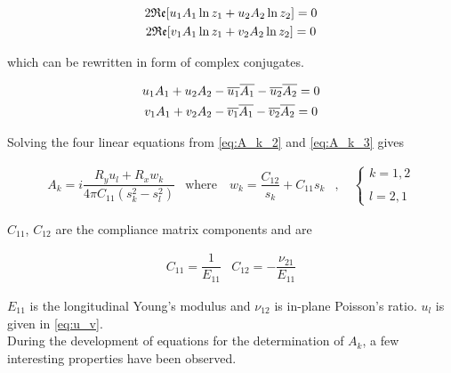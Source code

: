 \documentclass{article}
\begin{document}
\begin{gather*}
    2 \mathfrak{Re}[u_1 A_1 \ln z_1 + u_2 A_2 \ln z_2] = 0 \notag \\
    2 \mathfrak{Re}[v_1 A_1 \ln z_1 + v_2 A_2 \ln z_2] = 0
\end{gather*}

which can be rewritten in form of complex conjugates.

\begin{gather}
    u_1 A_1 + u_2 A_2 - \overline{u_1} \overline{A_1} - \overline{u_2} \overline{A_2} = 0 \notag \\
    v_1 A_1 + v_2 A_2 - \overline{v_1} \overline{A_1} - \overline{v_2} \overline{A_2} = 0
    \label{eq:A_k_3}
\end{gather}

Solving the four linear equations from \cref{eq:A_k_2} and \cref{eq:A_k_3} gives \cite{Koussios2009}

\begin{equation}
    \begin{matrix}
    A_k = i \dfrac{R_y u_l + R_x w_k}{4\pi C_{11} (s_k^2 - s_l^2)} &
    \text{where} \quad w_k = \dfrac{C_{12}}{s_k} + C_{11} s_k &, \quad 
    \left\{\begin{matrix}
    k = 1, 2  \\ 
    \\
    l = 2, 1
    \end{matrix}\right.
    \end{matrix}
    \label{eq:A_k}
\end{equation}

$C_{11}$, $C_{12}$ are the compliance matrix components and are

\begin{equation*}
    \begin{matrix}
    C_{11} = \dfrac{1}{E_{11}}&
    C_{12} = -\dfrac{\nu_{21}}{E_{11}}
    \end{matrix}
\end{equation*}

$E_{11}$ is the longitudinal Young's modulus and $\nu_{12}$ is in-plane Poisson's ratio. $u_l$ is given in \cref{eq:u_v}. \\

During the development of equations for the determination of $A_k$, a few interesting properties have been observed.
\end{document}
